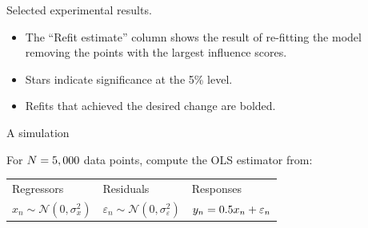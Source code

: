 \begin{frame}{Selected experimental results.}

\begin{itemize}
\item The ``Refit estimate'' column shows the result of re-fitting the model removing
the points with the largest influence scores.

\item Stars indicate significance at the 5\% level.

\item Refits that achieved the desired change are bolded.
\end{itemize}

{
\footnotesize
\MicrocreditProfitResultsTable{}
}


\end{frame}





\begin{frame}{A simulation}

For $N=5,000$ data points, compute the OLS estimator from:

\vspace{1em}
\begin{tabularx}{\textwidth}{YYY}
    Regressors  &   Residuals   &   Responses \\
    $x_n \sim \mathcal{N}(0, \sigma_x^2)$   &
    $\varepsilon_n \sim \mathcal{N}(0, \sigma_\varepsilon^2)$   &
    $y_n = 0.5 x_n + \varepsilon_n$
\end{tabularx}
%

\SimGridNormalGraph{}

\end{frame}

